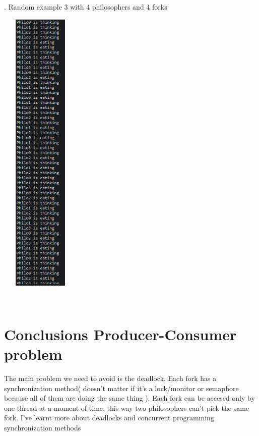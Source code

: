 \documentclass[14pt]{article}
\begin{document}
\begin{center}
. Random example 3 with 4 philosophers and 4 forks\\
\vspace{10mm}

\includegraphics[height=5.5in, width = 1.5in]{philo3.png}\\
\end{center}\\

\section*{Conclusions Producer-Consumer problem}
\vspace{10 mm}
The main problem we need to avoid is the deadlock. Each fork has a synchronization method( doesn't matter if it's a lock/monitor or semaphore because all of them are doing the same thing ). Each fork can be accesed only by one thread at a moment of time, this way two philosophers can't pick the same fork. I've learnt more about deadlocks and concurrent programming synchronization methods

\newpage
\end{document}
